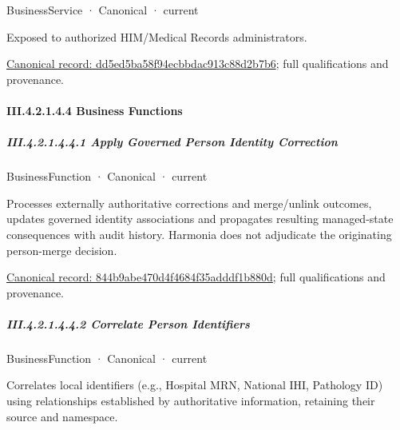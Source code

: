 \label{element:dd5ed5ba58f94ecbbdac913c88d2b7b6}
{\small BusinessService · Canonical · current}\par

Exposed to authorized HIM/Medical Records administrators.


{\footnotesize \href{../../../../../../../continuum/business/business-service/dd5ed5ba58f94ecbbdac913c88d2b7b6.md}{Canonical record: dd5ed5ba58f94ecbbdac913c88d2b7b6}; full qualifications and provenance.}\par
\paragraph*{III.4.2.1.4.4 Business Functions}
\label{navigation:III.4.2.1.4.4}

\subparagraph*{III.4.2.1.4.4.1 Apply Governed Person Identity Correction}
\label{navigation:III.4.2.1.4.4.1}

\label{element:844b9abe470d4f4684f35adddf1b880d}
{\small BusinessFunction · Canonical · current}\par

Processes externally authoritative corrections and merge/unlink outcomes, updates governed identity associations and propagates resulting managed-state consequences with audit history. Harmonia does not adjudicate the originating person-merge decision.


{\footnotesize \href{../../../../../../../continuum/business/business-function/844b9abe470d4f4684f35adddf1b880d.md}{Canonical record: 844b9abe470d4f4684f35adddf1b880d}; full qualifications and provenance.}\par
\subparagraph*{III.4.2.1.4.4.2 Correlate Person Identifiers}
\label{navigation:III.4.2.1.4.4.2}

\label{element:3050366e2e1d47eeaa4cfd6db92c0a56}
{\small BusinessFunction · Canonical · current}\par

Correlates local identifiers (e.g., Hospital MRN, National IHI, Pathology ID) using relationships established by authoritative information, retaining their source and namespace.


